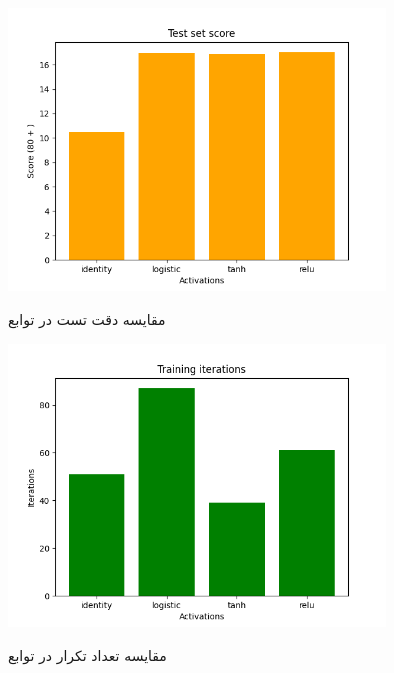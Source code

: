 \documentclass[12pt, dvipsnames, svgnames, x11names,]{article}
\begin{document}
		\begin{figure}
			\begin{center}
				{\includegraphics[width=10cm]{images/07.png}}
			\end{center}
			\caption{مقایسه دقت تست در توابع}
			\label{fig:atcivation:test}
		\end{figure}
		
		\begin{figure}
			\begin{center}
				{\includegraphics[width=10cm]{images/08.png}}
			\end{center}
			\caption{مقایسه تعداد تکرار در توابع}
			\label{fig:atcivation:iteration}
		\end{figure}
		
\end{document}
